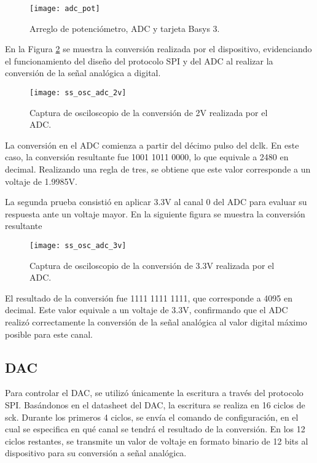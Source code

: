            \begin{figure}[hbtp]
                \centering
                \texttt{[image: adc\_pot]}
                \caption{Arreglo de potenciómetro, ADC y tarjeta Basys 3.}
                \label{fig:adc_pot}
            \end{figure}


 En la Figura \ref{fig:ss_osc_adc_2v} se muestra la conversión realizada por el dispositivo, evidenciando el funcionamiento del diseño del protocolo SPI y del ADC al realizar la conversión de la señal analógica a digital.

            \begin{figure}[hbtp]
                \centering
                \texttt{[image: ss\_osc\_adc\_2v]}
                \caption{Captura de osciloscopio de la conversión de 2V realizada por el ADC.}
                \label{fig:ss_osc_adc_2v}
            \end{figure} 

La conversión en el ADC comienza a partir del décimo pulso del dclk. En este caso, la conversión resultante fue 1001 1011 0000, lo que equivale a 2480 en decimal. Realizando una regla de tres, se obtiene que este valor corresponde a un voltaje de 1.9985V.


La segunda prueba consistió en aplicar 3.3V al canal 0 del ADC para evaluar su respuesta ante un voltaje mayor. En la siguiente figura se muestra la conversión resultante
            \begin{figure}[hbtp]
                \centering
                \texttt{[image: ss\_osc\_adc\_3v]}
                \caption{Captura de osciloscopio de la conversión de 3.3V realizada por el ADC.}
                \label{fig:ss_osc_adc_3v}
            \end{figure} 

El resultado de la conversión fue 1111 1111 1111, que corresponde a 4095 en decimal. Este valor equivale a un voltaje de 3.3V, confirmando que el ADC realizó correctamente la conversión de la señal analógica al valor digital máximo posible para este canal.
     
\subsection{DAC}
Para controlar el DAC, se utilizó únicamente la escritura a través del protocolo SPI. Basándonos en el datasheet del DAC, la escritura se realiza en 16 ciclos de sck. Durante los primeros 4 ciclos, se envía el comando de configuración, en el cual se especifica en qué canal se tendrá el resultado de la conversión. En los 12 ciclos restantes, se transmite un valor de voltaje en formato binario de 12 bits al dispositivo para su conversión a señal analógica.


